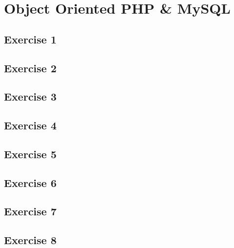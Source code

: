 \chapter{Object Oriented PHP \& MySQL}

\section{Exercise 1}
\section{Exercise 2}
\section{Exercise 3}
\section{Exercise 4}
\section{Exercise 5}
\section{Exercise 6}
\section{Exercise 7}
\section{Exercise 8}

